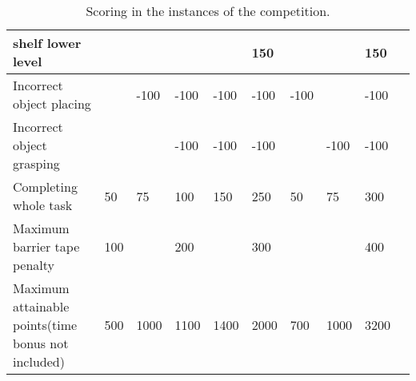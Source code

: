 \begin{landscape}
\begin{table}
\begin{tabular}{|p{5.5cm}*{9}{|P{1cm}}|}
		\hspace{0.5cm} shelf lower level  &      &      &       &       &  150  &       &       &  150  \\ \hline
    Incorrect object placing        &      & -100 & -100  & -100  & -100  & -100  &       & -100  \\
    Incorrect object grasping       &      &      & -100  & -100  & -100  &       & -100  & -100  \\
    Completing whole task           &  50  &  75  &   100  &   150   &   250  &    50    &   75   &  300   \\ \hline\hline
    Maximum barrier \newline tape penalty    &  100  &      &  200  &       &  300  &       &       &  400  \\ \hline\hline
    Maximum attainable points\newline (time bonus not included)
	                                  & 500  &  1000 &  1100 &  1400  &  2000  &  700  &  1000  &  3200 \\ \hline
 \end{tabular}
 \caption{Scoring in the instances of the \RCAW \YEAR competition.}
  \label{tab:InstancePoints}
\end{table}
\end{landscape}
